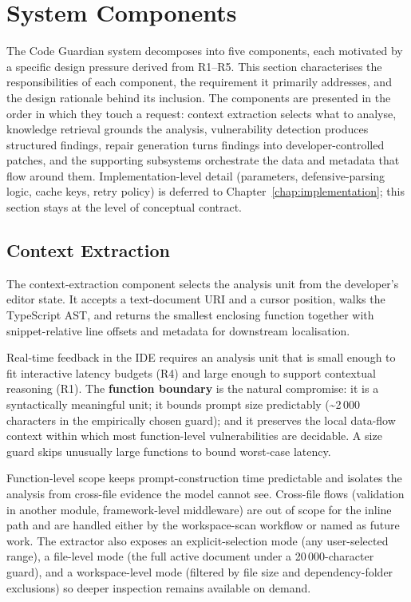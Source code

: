 \section{System Components}
\label{sec:system-components}

The Code Guardian system decomposes into five components, each motivated by a specific design pressure derived from R1--R5. This section characterises the responsibilities of each component, the requirement it primarily addresses, and the design rationale behind its inclusion. The components are presented in the order in which they touch a request: context extraction selects what to analyse, knowledge retrieval grounds the analysis, vulnerability detection produces structured findings, repair generation turns findings into developer-controlled patches, and the supporting subsystems orchestrate the data and metadata that flow around them. Implementation-level detail (parameters, defensive-parsing logic, cache keys, retry policy) is deferred to Chapter~\ref{chap:implementation}; this section stays at the level of conceptual contract.

\subsection{Context Extraction}
\label{subsec:context-extraction}

The context-extraction component selects the analysis unit from the developer's editor state. It accepts a text-document URI and a cursor position, walks the TypeScript AST, and returns the smallest enclosing function together with snippet-relative line offsets and metadata for downstream localisation.

Real-time feedback in the IDE requires an analysis unit that is small enough to fit interactive latency budgets (R4) and large enough to support contextual reasoning (R1). The \textbf{function boundary} is the natural compromise: it is a syntactically meaningful unit; it bounds prompt size predictably (\textasciitilde2\,000 characters in the empirically chosen guard); and it preserves the local data-flow context within which most function-level vulnerabilities are decidable. A size guard skips unusually large functions to bound worst-case latency.

Function-level scope keeps prompt-construction time predictable and isolates the analysis from cross-file evidence the model cannot see. Cross-file flows (validation in another module, framework-level middleware) are out of scope for the inline path and are handled either by the workspace-scan workflow or named as future work. The extractor also exposes an explicit-selection mode (any user-selected range), a file-level mode (the full active document under a 20\,000-character guard), and a workspace-level mode (filtered by file size and dependency-folder exclusions) so deeper inspection remains available on demand.

